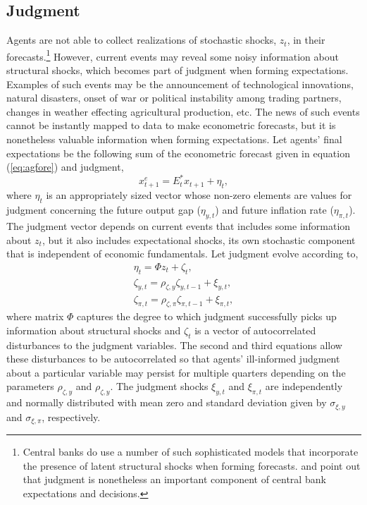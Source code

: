 \documentclass[10pt]{article}
\newcommand{\beq}{\begin{equation}}
\newcommand{\eeq}{\end{equation}}
\newcommand{\citee}[1]{\citet{#1}}
\newcommand{\ds}{\displaystyle}
\begin{document}
\subsection{Judgment}
Agents are not able to collect realizations of stochastic shocks, $z_t$, in their forecasts.\footnote{Central banks do use a number of such sophisticated models that incorporate the presence of latent structural shocks when forming forecasts.  \citee{rsw1997} and \citee{svensson2005} point out that judgment is nonetheless an important component of central bank expectations and decisions.}  However, current events may reveal some noisy information about structural shocks, which becomes part of judgment when forming expectations.  Examples of such events may be the announcement of technological innovations, natural disasters, onset of war or political instability among trading partners, changes in weather effecting agricultural production, etc.  The news of such events cannot be instantly mapped to data to make econometric forecasts, but it is nonetheless valuable information when forming expectations.  Let agents' final expectations be the following sum of the econometric forecast given in equation (\ref{eq:agfore}) and judgment,
\beq x_{t+1}^e = E_t^* x_{t+1} + \eta_{t}, \eeq
where $\eta_t$ is an appropriately sized vector whose non-zero elements are values for judgment concerning the future output gap ($\eta_{y,t}$) and future inflation rate ($\eta_{\pi,t}$).  The judgment vector depends on current events that includes some information about $z_t$, but it also includes expectational shocks, its own stochastic component that is independent of economic fundamentals.  Let judgment evolve according to,
\beq \label{eq:news} \begin{array}{c} \ds \eta_t = \Phi z_t + \zeta_t, \\ [1pc]
 \ds \zeta_{y,t} = \rho_{\zeta,y} \zeta_{y,t-1} + \xi_{y,t}, \\ [1pc]
 \ds \zeta_{\pi,t} = \rho_{\zeta,\pi} \zeta_{\pi,t-1} + \xi_{\pi,t},
\end{array} \eeq
where matrix $\Phi$ captures the degree to which judgment successfully picks up information about structural shocks and $\zeta_t$ is a vector of autocorrelated disturbances to the judgment variables.  The second and third equations allow these disturbances to be autocorrelated so that agents' ill-informed judgment about a particular variable may persist for multiple quarters depending on the parameters $\rho_{\zeta,y}$ and $\rho_{\zeta,y}$.  The judgment shocks $\xi_{y,t}$ and $\xi_{\pi,t}$ are independently and normally distributed with mean zero and standard deviation given by $\sigma_{\xi,y}$ and $\sigma_{\xi,\pi}$, respectively.  
\end{document}
